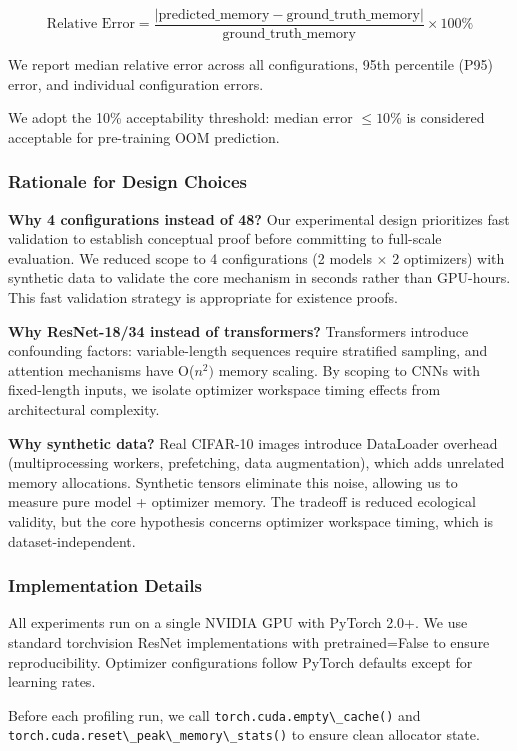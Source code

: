 $$\text{Relative Error} = \frac{|\text{predicted\_memory} - \text{ground\_truth\_memory}|}{\text{ground\_truth\_memory}} \times 100\%$$

We report median relative error across all configurations, 95th percentile (P95) error, and individual configuration errors.

We adopt the 10\% acceptability threshold: median error $\leq 10$\% is considered acceptable for pre-training OOM prediction.

\subsubsection{Rationale for Design Choices}

\textbf{Why 4 configurations instead of 48?} Our experimental design prioritizes fast validation to establish conceptual proof before committing to full-scale evaluation. We reduced scope to 4 configurations (2 models $\times$ 2 optimizers) with synthetic data to validate the core mechanism in seconds rather than GPU-hours. This fast validation strategy is appropriate for existence proofs.

\textbf{Why ResNet-18/34 instead of transformers?} Transformers introduce confounding factors: variable-length sequences require stratified sampling, and attention mechanisms have O($n^{2})$ memory scaling. By scoping to CNNs with fixed-length inputs, we isolate optimizer workspace timing effects from architectural complexity.

\textbf{Why synthetic data?} Real CIFAR-10 images introduce DataLoader overhead (multiprocessing workers, prefetching, data augmentation), which adds unrelated memory allocations. Synthetic tensors eliminate this noise, allowing us to measure pure model + optimizer memory. The tradeoff is reduced ecological validity, but the core hypothesis concerns optimizer workspace timing, which is dataset-independent.

\subsubsection{Implementation Details}

All experiments run on a single NVIDIA GPU with PyTorch 2.0+. We use standard torchvision ResNet implementations with pretrained=False to ensure reproducibility. Optimizer configurations follow PyTorch defaults except for learning rates.

Before each profiling run, we call \texttt{torch.cuda.empty\textbackslash \_cache()} and \texttt{torch.cuda.reset\textbackslash \_peak\textbackslash \_memory\textbackslash \_stats()} to ensure clean allocator state.

